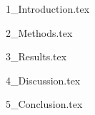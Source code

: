 \documentclass[a4paper, 11pt]{article}
\begin{document}








\tableofcontents

\newpage
\listoffigures

\newpage
\listoftables

{1_Introduction.tex}

{2_Methods.tex}

{3_Results.tex}

{4_Discussion.tex}

{5_Conclusion.tex}

\newpage
\printbibliography



\end{document}
